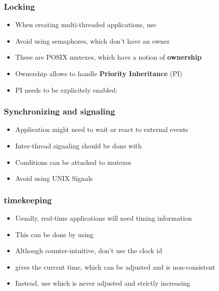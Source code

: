\begin{frame}
	\frametitle{Locking}
	\begin{itemize}
		\item When creating multi-threaded applications, use 
		\item Avoid using semaphores, which don't have an owner
		\item These are POSIX mutexes, which have a notion of \textbf{ownership}
		\item Ownership allows to handle \textbf{Priority Inheritance} (PI)
		\item PI needs to be explicitely enabled: 
	\end{itemize}
\end{frame}

\begin{frame}
	\frametitle{Synchronizing and signaling}
	\begin{itemize}
		\item Application might need to wait or react to external events
		\item Inter-thread signaling should be done with 
		\item Conditions can be attached to mutexes
		\item Avoid using UNIX Signals
	\end{itemize}
\end{frame}

\begin{frame}
	\frametitle{timekeeping}
	\begin{itemize}
		\item Usually, real-time applications will need timing information
		\item This can be done by using 
		\item Although counter-intuitive, don't use the  clock id
		\item {} gives the current time, which can be adjusted and is non-consistent
		\item Instead, use  which is never adjusted and strictly increasing
	\end{itemize}
\end{frame}
